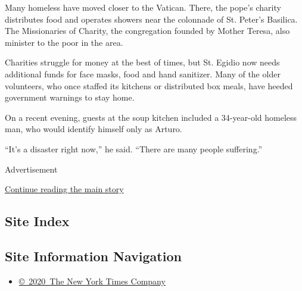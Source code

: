 Many homeless have moved closer to the Vatican. There, the pope's
charity distributes food and operates showers near the colonnade of St.
Peter's Basilica. The Missionaries of Charity, the congregation founded
by Mother Teresa, also minister to the poor in the area.

Charities struggle for money at the best of times, but St. Egidio now
needs additional funds for face masks, food and hand sanitizer. Many of
the older volunteers, who once staffed its kitchens or distributed box
meals, have heeded government warnings to stay home.

On a recent evening, guests at the soup kitchen included a 34-year-old
homeless man, who would identify himself only as Arturo.

``It's a disaster right now,'' he said. ``There are many people
suffering.''

Advertisement

\protect\hyperlink{after-bottom}{Continue reading the main story}

\hypertarget{site-index}{%
\subsection{Site Index}\label{site-index}}

\hypertarget{site-information-navigation}{%
\subsection{Site Information
Navigation}\label{site-information-navigation}}

\begin{itemize}
\tightlist
\item
  \href{https://help.nytimes3xbfgragh.onion/hc/en-us/articles/115014792127-Copyright-notice}{©~2020~The
  New York Times Company}
\end{itemize}

